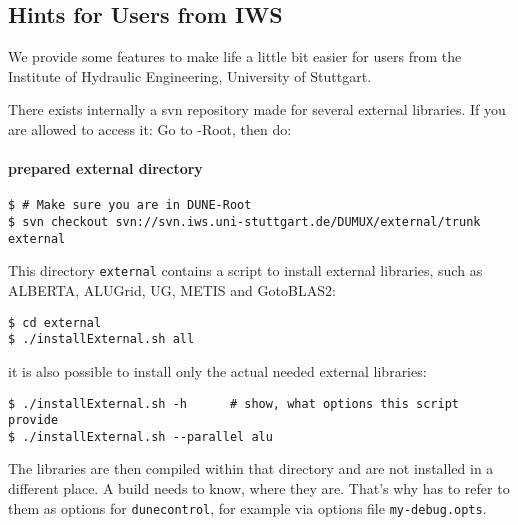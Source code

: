 \subsection{Hints for Users from IWS}
We provide some features to make life a little bit easier for
users from the Institute of Hydraulic Engineering, University of Stuttgart.

There exists internally a svn repository made for several external libraries.
If you are allowed to access it: Go to {\Dune}-Root, then do: 
\paragraph{prepared external directory}

\begin{lstlisting}[style=Bash]
$ # Make sure you are in DUNE-Root
$ svn checkout svn://svn.iws.uni-stuttgart.de/DUMUX/external/trunk external
\end{lstlisting}

This directory \texttt{external} contains a script to install external libraries, such as 
ALBERTA, ALUGrid, UG, METIS and GotoBLAS2: 

\begin{lstlisting}[style=Bash]
$ cd external
$ ./installExternal.sh all
\end{lstlisting}

it is also possible to install only the actual needed external libraries:

\begin{lstlisting}[style=Bash]
$ ./installExternal.sh -h      # show, what options this script provide
$ ./installExternal.sh --parallel alu
\end{lstlisting}

The libraries are then compiled within that directory and are not installed in a different place. 
A \Dune build needs to know, where they are. That's why has to refer to them as options for \texttt{dunecontrol}, for example via options file \texttt{my-debug.opts}.

